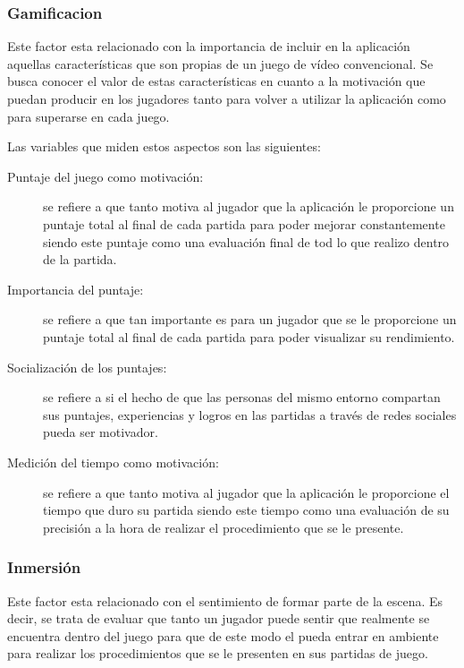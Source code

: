 \subsubsection{Gamificacion}

Este factor esta relacionado con la importancia de incluir en la aplicación
aquellas características que son propias de un juego de vídeo convencional. Se
busca conocer el valor de estas características en cuanto a la motivación que
puedan producir en los jugadores tanto para volver a utilizar la aplicación como
para superarse en cada juego.

Las variables que miden estos aspectos son las siguientes:

\begin{description}
   
\item[Puntaje del juego como motivación:] se refiere a que tanto motiva al
    jugador que la aplicación le proporcione un puntaje total al final de cada
    partida para poder mejorar constantemente siendo este puntaje como una
    evaluación final de tod lo que realizo dentro de la partida.

\item[Importancia del puntaje:] se refiere a que tan importante es para un
    jugador que se le proporcione un puntaje total al final de cada partida para
    poder visualizar su rendimiento.

\item[Socialización de los puntajes:] se refiere a si el hecho de que las
    personas del mismo entorno compartan sus puntajes, experiencias y logros en
    las partidas a través de redes sociales pueda ser motivador.

\item[Medición del tiempo como motivación:] se refiere a que tanto motiva al
    jugador que la aplicación le proporcione el tiempo que duro su partida
    siendo este tiempo como una evaluación de su precisión a la hora de realizar
    el procedimiento que se le presente.

\end{description} \subsubsection{Inmersión}

Este factor esta relacionado con el sentimiento de formar parte de la escena. Es
decir, se trata de evaluar que tanto un jugador puede sentir que realmente se
encuentra dentro del juego para que de este modo el pueda entrar en ambiente
para realizar los procedimientos que se le presenten en sus partidas de juego.

